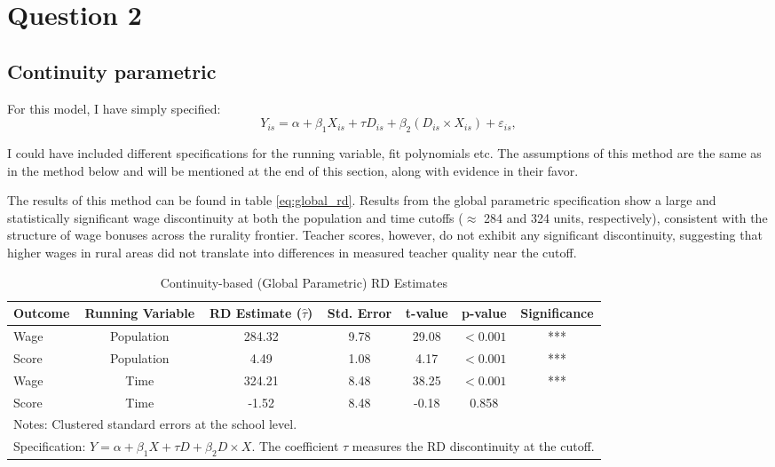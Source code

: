 \documentclass{article}
\begin{document}
\section{Question 2}

\subsection{Continuity parametric}

For this model, I have simply specified:
\begin{equation}
Y_{is} = \alpha + \beta_1 X_{is} + \tau D_{is} + \beta_2 (D_{is} \times X_{is}) + \varepsilon_{is},
\label{eq:global_rd}
\end{equation}

I could have included different specifications for the running variable, fit polynomials etc. The assumptions of this method are the same as in the method below and will be mentioned at the end of this section, along with evidence in their favor. 

The results of this method can be found in table \ref{eq:global_rd}. 
Results from the global parametric specification show a large and statistically significant wage discontinuity at both the population and time cutoffs ($\approx$ 284 and 324 units, respectively), consistent with the structure of wage bonuses across the rurality frontier. Teacher scores, however, do not exhibit any significant discontinuity, suggesting that higher wages in rural areas did not translate into differences in measured teacher quality near the cutoff.

\begin{table}[H]
\centering
\caption{Continuity-based (Global Parametric) RD Estimates}
\label{tab:global_rd}
\begin{tabular}{lcccccc}
\hline
Outcome & Running Variable & RD Estimate ($\hat{\tau}$) & Std. Error & t-value & p-value & Significance \\
\hline
Wage   & Population & 284.32 & 9.78 & 29.08 & $<0.001$ & *** \\
Score  & Population & 4.49   & 1.08 & 4.17  & $<0.001$ & *** \\
Wage   & Time       & 324.21 & 8.48 & 38.25 & $<0.001$ & *** \\
Score  & Time       & -1.52  & 8.48 & -0.18 & 0.858 &  \\
\hline
\multicolumn{7}{l}{\footnotesize Notes: Clustered standard errors at the school level.} \\
\multicolumn{7}{l}{\footnotesize Specification: $Y = \alpha + \beta_1 X + \tau D + \beta_2 D\times X$. The coefficient $\tau$ measures the RD discontinuity at the cutoff.}\\
\end{tabular}
\end{table}
\end{document}
